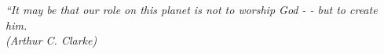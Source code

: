 \begin{epigrafe}
    \vspace*{\fill}
	\begin{flushright}
	
		\textit{``It may be that our role on this planet
is not to worship God - - but to create him.\\(Arthur C. Clarke)}
	\end{flushright}
\end{epigrafe}

